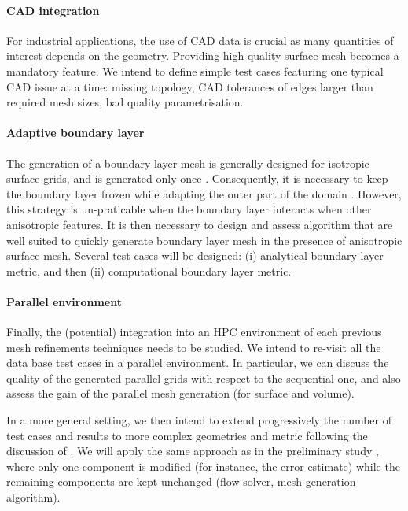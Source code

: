 \documentclass[3p,times,procedia,number]{elsarticle}
\begin{document}
\paragraph{CAD integration} For industrial applications, the use of CAD data is crucial as many quantities of interest
depends on the geometry. Providing high quality surface mesh becomes a mandatory feature.
We intend to define simple test cases featuring one typical CAD issue at a time: missing topology,  CAD tolerances of edges larger than required mesh sizes,
bad quality parametrisation.


\paragraph{Adaptive boundary layer} The generation of a boundary layer mesh is generally designed for isotropic surface grids,
and is generated only once \cite{pirzadeh-advancing-layer,loseille-lohner-imr21-robust-bl-gen}. Consequently, it is necessary to keep the boundary layer frozen while adapting
the outer part of the domain \cite{park-carlson-turbulent-output-adapt-aiaa}. However, this strategy is un-praticable  when the boundary layer
interacts when other anisotropic features. It is then necessary to design and assess algorithm that are well suited to quickly generate boundary layer mesh
in the presence of anisotropic surface mesh. Several test cases will be designed:
(i) analytical boundary layer metric, and then (ii) computational boundary layer metric.


\paragraph{Parallel environment} Finally, the (potential) integration into an HPC environment \cite{jansson-hoffman-jansson-siamjsc-2012-para-adapt-fe-cfd} of each previous mesh refinements techniques needs to be studied. We intend to re-visit all the data base test cases in a parallel environment. In particular,
we can discuss the quality of the generated parallel grids with respect to the sequential one, and also assess the gain of the parallel mesh generation (for
surface and volume).

In a more general setting, we then intend to extend progressively the number of test cases and results to more complex geometries and metric
following the discussion of \cite{park-unstruct-adapt-status-cfd2030}. We will apply the same approach as in the preliminary study \cite{park-loseille-krakos-michal-adapt-decomposition},
where only one component is modified (for instance, the error estimate) while the remaining
components are kept unchanged (flow solver, mesh generation algorithm).
\end{document}
